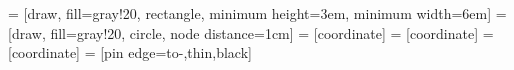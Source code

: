 \usetikzlibrary{shapes,arrows}

 = [draw, fill=gray!20, rectangle, minimum height=3em, minimum width=6em]
 = [draw, fill=gray!20, circle, node distance=1cm]
 = [coordinate]
 = [coordinate]
 = [coordinate]
 = [pin edge={to-,thin,black}]
